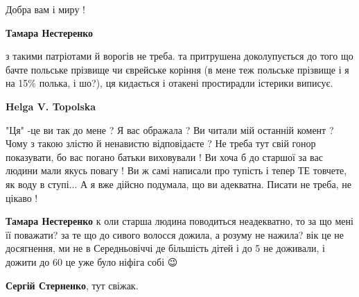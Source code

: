 \begin{itemize}
\begin{itemize}
\begin{itemize}
Добра вам і миру !

 
\textbf{Тамара Нестеренко} 

з такими патріотами й ворогів не треба. та притрушена доколупується до того що
бачте польське прізвище чи єврейське коріння (в мене теж польське прізвище і я
на 15\% полька, і шо?), ця кидається і отакені простирадли істерики виписує.

 
\textbf{Helga V. Topolska} 

"Ця" -це ви так до мене ? Я вас ображала ? Ви читали мій останній комент ? Чому
з такою злістю й ненавистю відповідаєте ? Не треба тут свій гонор показувати,
бо вас погано батьки виховували ! Ви хоча б до старшої за вас людини мали якусь
повагу ! Ви ж самі написали про тупість і тепер ТЕ товчете, як воду в ступі... А
я вже дійсно подумала, що ви адекватна. Писати не треба, не цікаво !


\textbf{Тамара Нестеренко} к
оли старша людина поводиться неадекватно, то за що мені її поважати? за те що
до сивого волосся дожила, а розуму не нажила? вік це не досягнення, ми не в
Середньовіччі де більшість дітей і до 5 не доживали, і дожити до 60 це уже було
ніфіга собі 😉
\end{itemize}

\end{itemize}

 
\textbf{Сергій Стерненко}, тут свіжак.

\begin{itemize}
 

\end{itemize}
\end{itemize}
